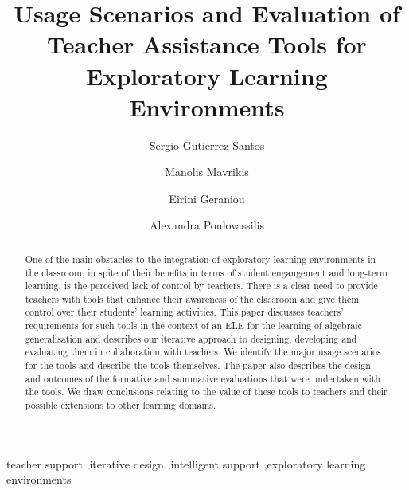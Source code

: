 \documentclass[authoryear,preprint,12pt]{elsarticle}
\begin{document}
\begin{frontmatter}



\title{Usage Scenarios and Evaluation of Teacher Assistance Tools for Exploratory Learning Environments} 


\author[BBK]{Sergio Gutierrez-Santos}
\author[IoE]{Manolis Mavrikis}
\author[IoE]{Eirini Geraniou}
\author[BBK]{Alexandra Poulovassilis}

\address[BBK]{London Knowledge Lab, Birkbeck}
\address[IoE]{London Knowledge Lab, Institute of Education}

\begin{abstract}
One of the main obstacles to the integration of exploratory learning
environments in the classroom, in spite of their benefits in terms of
student engangement and long-term learning, is the perceived lack of
control by teachers. There is a clear need to provide teachers with
tools that enhance their awareness of the classroom and give them
control over their students' learning activities. 
%
This paper discusses
teachers’ requirements for such tools in the context of an ELE for the
learning of algebraic generalisation and describes our iterative
approach to designing, developing and evaluating them in collaboration
with teachers. We identify the major usage scenarios for the tools and
describe the tools themselves. 
%
The paper also describes the design and outcomes of the formative and
summative evaluations that were undertaken with the tools. We draw
conclusions relating to the value of these tools to teachers and their
possible extensions to other learning domains.
\end{abstract}

\begin{keyword}
     teacher support 
\sep iterative design 
\sep intelligent support 
\sep exploratory learning environments
\end{keyword}

\end{frontmatter}
\end{document}
